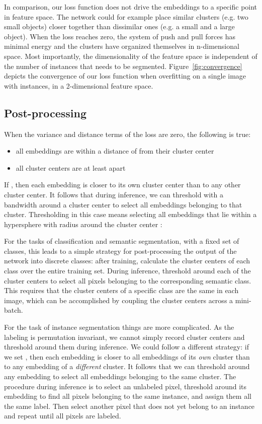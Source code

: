 \documentclass[10pt,twocolumn,letterpaper]{article}
\begin{document}
In comparison, our loss function does not drive the embeddings to a specific point in feature space. The network could for example place similar clusters (e.g. two small objects) closer together than dissimilar ones (e.g. a small and a large object). When the loss reaches zero, the system of push and pull forces has minimal energy and the clusters have organized themselves in n-dimensional space. Most importantly, the dimensionality of the feature space is independent of the number of instances that needs to be segmented. Figure~\ref{fig:convergence} depicts the convergence of our loss function when overfitting on a single image with  instances, in a 2-dimensional feature space.

\subsection{Post-processing}
\label{sec:postprocessing}
When the variance and distance terms of the loss are zero, the following is true:

\begin{itemize}
	\item all embeddings are within a distance of  from their cluster center
	\item all cluster centers are at least  apart
\end{itemize}

If , then each embedding is closer to its own cluster center than to any other cluster center. It follows that during inference, we can threshold with a bandwidth  around a cluster center to select all embeddings belonging to that cluster. Thresholding in this case means selecting all embeddings  that lie within a hypersphere with radius  around the cluster center : 

For the tasks of classification and semantic segmentation, with a fixed set of classes, this leads to a simple strategy for post-processing the output of the network into discrete classes: after training, calculate the cluster centers of each class over the entire training set. During inference, threshold around each of the cluster centers to select all pixels belonging to the corresponding semantic class. This requires that the cluster centers of a specific class are the same in each image, which can be accomplished by coupling the cluster centers across a mini-batch.

For the task of instance segmentation things are more complicated. As the labeling is permutation invariant, we cannot simply record cluster centers and threshold around them during inference. We could follow a different strategy: if we set , then each embedding is closer to all embeddings of its \textit{own} cluster than to any embedding of a \textit{different} cluster. It follows that we can threshold around any embedding to select all embeddings belonging to the same cluster. The procedure during inference is to select an unlabeled pixel, threshold around its embedding to find all pixels belonging to the same instance, and assign them all the same label. Then select another pixel that does not yet belong to an instance and repeat until all pixels are labeled. 
\end{document}
